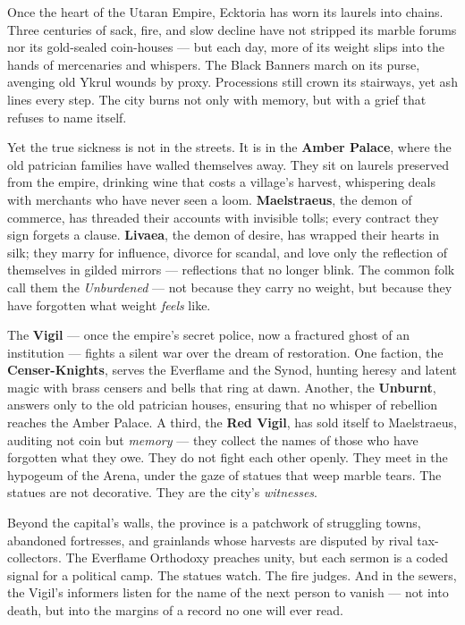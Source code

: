 \vspace{2mm}
\begin{tcolorbox}[colback=black!3,colframe=blue!60!black,title={Theme \& Atmosphere},breakable]
Once the heart of the Utaran Empire, Ecktoria has worn its laurels into chains. Three centuries of sack, fire, and slow decline have not stripped its marble forums nor its gold-sealed coin-houses --- but each day, more of its weight slips into the hands of mercenaries and whispers. The Black Banners march on its purse, avenging old Ykrul wounds by proxy. Processions still crown its stairways, yet ash lines every step. The city burns not only with memory, but with a grief that refuses to name itself.

Yet the true sickness is not in the streets. It is in the \textbf{Amber Palace}, where the old patrician families have walled themselves away. They sit on laurels preserved from the empire, drinking wine that costs a village's harvest, whispering deals with merchants who have never seen a loom. \textbf{Maelstraeus}, the demon of commerce, has threaded their accounts with invisible tolls; every contract they sign forgets a clause. \textbf{Livaea}, the demon of desire, has wrapped their hearts in silk; they marry for influence, divorce for scandal, and love only the reflection of themselves in gilded mirrors --- reflections that no longer blink. The common folk call them the \emph{Unburdened} --- not because they carry no weight, but because they have forgotten what weight \textit{feels} like.

The \textbf{Vigil} --- once the empire's secret police, now a fractured ghost of an institution --- fights a silent war over the dream of restoration. One faction, the \textbf{Censer-Knights}, serves the Everflame and the Synod, hunting heresy and latent magic with brass censers and bells that ring at dawn. Another, the \textbf{Unburnt}, answers only to the old patrician houses, ensuring that no whisper of rebellion reaches the Amber Palace. A third, the \textbf{Red Vigil}, has sold itself to Maelstraeus, auditing not coin but \textit{memory} --- they collect the names of those who have forgotten what they owe. They do not fight each other openly. They meet in the hypogeum of the Arena, under the gaze of statues that weep marble tears. The statues are not decorative. They are the city's \textit{witnesses}.

Beyond the capital's walls, the province is a patchwork of struggling towns, abandoned fortresses, and grainlands whose harvests are disputed by rival tax-collectors. The Everflame Orthodoxy preaches unity, but each sermon is a coded signal for a political camp. The statues watch. The fire judges. And in the sewers, the Vigil's informers listen for the name of the next person to vanish --- not into death, but into the margins of a record no one will ever read.
\end{tcolorbox}

